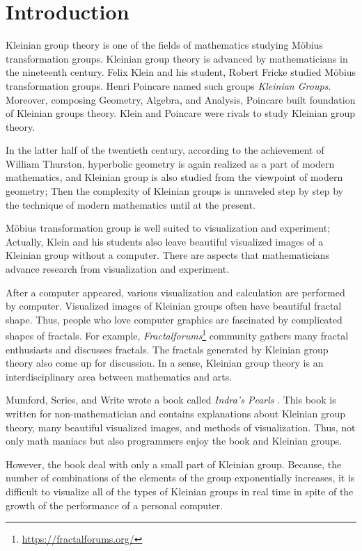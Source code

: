 
\section{Introduction}

Kleinian group theory is one of the fields of mathematics studying 
M\"obius transformation groups.
Kleinian group theory is advanced by mathematicians in the nineteenth
century.
Felix Klein and his student, Robert Fricke studied M\"obius
transformation groups.
Henri Poincare named such groups \textit{Kleinian Groups}.
Moreover, composing Geometry, Algebra, and Analysis,
Poincare built foundation of Kleinian groups theory.
Klein and Poincare were rivals to study Kleinian group theory.

In the latter half of the twentieth century, according to the
achievement of William Thurston, hyperbolic geometry is again realized 
as a part of modern mathematics, and Kleinian group is also studied from
the viewpoint of modern geometry;
Then the complexity of Kleinian groups is unraveled step by step by
the technique of modern mathematics until at the present.

M\"obius transformation group is well suited to visualization and
experiment; Actually, Klein and his students also leave beautiful
visualized images of a Kleinian group without a computer.
There are aspects that mathematicians advance research from
visualization and experiment.

After a computer appeared, various visualization and calculation are
performed by computer.
Visualized images of Kleinian groups often have beautiful fractal shape.
Thus, people who love computer graphics are fascinated by complicated shapes of fractals.
For example,
\textit{Fractalforums}\footnote{\url{https://fractalforums.org/}}
community gathers many fractal enthusiasts and discusses fractals.
The fractals generated by Kleinian group theory also come up for
discussion.
In a sense, Kleinian group theory is an interdisciplinary area between
mathematics and arts.

Mumford, Series, and Write wrote a book called
\textit{Indra's Pearls} \cite{MumfordSeriesWright200204}.
This book is written for non-mathematician and contains explanations
about Kleinian group theory, many beautiful visualized images, and
methods of visualization.
Thus, not only math maniacs but also programmers enjoy the book and
Kleinian groups.

However, the book deal with only a small part of Kleinian group.
Because, the number of combinations of the elements of the group
exponentially increases, it is difficult to
visualize all of the types of Kleinian groups in real time
in spite of the growth of the performance of a personal computer.

